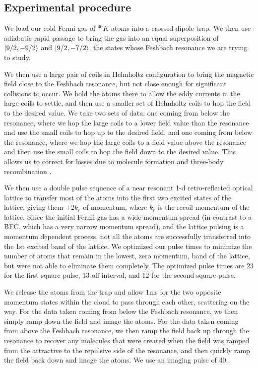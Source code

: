 \documentclass[12pt]{iopart}
\begin{document}
\subsection{Experimental procedure}
We load our cold Fermi gas of $^{40}K$ atoms into a crossed dipole trap. We then use adiabatic rapid passage to bring the gas into an equal superposition of $\mathinner{|{9/2,-9/2}\rangle}$ and $\mathinner{|{9/2,-7/2}\rangle}$, the states whose Feshbach resonance we are trying to study. 
\par We then use a large pair of  coils in Helmholtz configuration to bring the magnetic field close to the Feshbach resonance, but not close enough for significant collisions to occur. We hold the atoms there to allow the eddy currents in the large coils to settle, and then use a smaller set of Helmholtz coils to hop the field to the desired value. We take two sets of data: one coming from below the resonance, where we hop the large coils to a lower field value than the resonance and use the small coils to hop up to the desired field, and one coming from below the resonance, where we hop the large coils to a field value above the resonance and then use the small coils to hop the field down to the desired value. This allows us to correct for losses due to molecule formation and three-body recombination \cite{Chin10}.
\par We then use a double pulse sequence \cite{Wu05} of a near resonant 1-d retro-reflected optical lattice to transfer most of the atoms into the first two excited states of the lattice, giving them $\pm 2k_r$ of momentum, where $k_r$ is the recoil momentum of the lattice. Since the initial Fermi gas has a wide momentum spread (in contrast to a BEC, which has a very narrow momentum spread), and the lattice pulsing is a momentum dependent process, not all the atoms are successfully transferred into the 1st excited band of the lattice. We optimized our pulse times to minimize the number of atoms that remain in the lowest, zero momentum, band of the lattice, but were not able to eliminate them completely. The optimized pulse times are 23\us{} for the first square pulse, 13\us{} off interval, and 12\us{} for the second square pulse. 
\par We release the atoms from the trap and allow 1ms for the two opposite momentum states within the cloud to pass through each other, scattering on the way. For the data taken coming from below the Feshbach resonance, we then simply ramp down the field and image the atoms. For the data taken coming from above the Feshbach resonance, we then ramp the field back up through the resonance to recover any molecules that were created when the field was ramped from the attractive to the repulsive side of the resonance, and then quickly ramp the field back down and image the atoms. We use an imaging pulse of 40\us{}.
\end{document}
